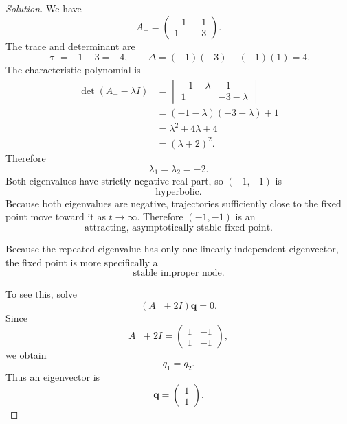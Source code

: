 \documentclass[12pt]{amsart}
\theoremstyle{conjecture}
\theoremstyle{definition}
\theoremstyle{question}
\theoremstyle{theorem}
\newenvironment{solution}
{\begin{proof}[Solution]}
{\end{proof}}
\begin{document}
\begin{solution}
        We have
        \[
            A_-=
            \begin{pmatrix}
                -1 & -1\\
                1 & -3
            \end{pmatrix}.
        \]
        The trace and determinant are
        \[
            \uptau=-1-3=-4,
            \qquad
            \Delta=(-1)(-3)-(-1)(1)=4.
        \]
        The characteristic polynomial is
        \begin{align*}
            \det(A_- -\lambda I)
            &=
            \begin{vmatrix}
                -1-\lambda & -1\\
                1 & -3-\lambda
            \end{vmatrix}\\
            &=(-1-\lambda)(-3-\lambda)+1\\
            &=\lambda^2+4\lambda+4\\
            &=(\lambda+2)^2.
        \end{align*}
        Therefore
        \[
            \boxed{\lambda_1=\lambda_2=-2.}
        \]
        Both eigenvalues have strictly negative real part, so $(-1,-1)$ is
        \[
            \boxed{\text{hyperbolic}.}
        \]
        Because both eigenvalues are negative, trajectories sufficiently
        close to the fixed point move toward it as $t\to\infty$.  Therefore
        $(-1,-1)$ is an
        \[
            \boxed{\text{attracting, asymptotically stable fixed point}.}
        \]

        Because the repeated eigenvalue has only one linearly independent
        eigenvector, the fixed point is more specifically a
        \[
            \boxed{\text{stable improper node}.}
        \]

        To see this, solve
        \[
            (A_-+2I)\mathbf{q}=0.
        \]
        Since
        \[
            A_-+2I
            =
            \begin{pmatrix}
                1 & -1\\
                1 & -1
            \end{pmatrix},
        \]
        we obtain
        \[
            q_1=q_2.
        \]
        Thus an eigenvector is
        \[
            \boxed{
                \mathbf{q}
                =
                \begin{pmatrix}
                    1\\
                    1
                \end{pmatrix}.}
        \]


\end{solution}
\end{document}
